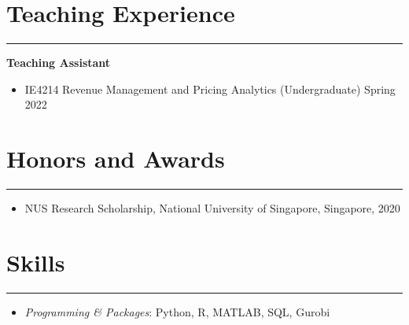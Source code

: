 \documentclass[12pt, a4paper]{article}
\begin{document}
{\section*{Teaching Experience}
\vspace*{0.4em}
\hrule height 0.5pt
\raggedright\textbf{Teaching Assistant}
\begin{itemize}[leftmargin=36pt, itemsep=2pt, parsep=0pt, topsep=-0.5em]

	\item IE4214 Revenue Management and Pricing Analytics (Undergraduate) \hfill Spring 2022

\end{itemize}




\section*{Honors and Awards}
\vspace*{0.4em}
\hrule height 0.5pt
\begin{itemize}[leftmargin=36pt, itemsep=1pt, parsep=0.5pt, topsep=1pt]

	\item NUS Research Scholarship, National University of Singapore, Singapore, 2020
	



\end{itemize}




\section*{Skills}
\vspace*{0.4em}
\hrule height 0.5pt
\begin{itemize}[leftmargin=36pt, itemsep=2pt, parsep=0.2pt, topsep=1pt]

	\item {\it Programming \& Packages}: Python, R, MATLAB, SQL, Gurobi

\end{itemize}
}



\end{document}
